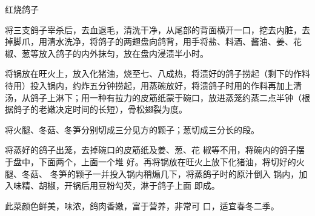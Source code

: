 \begin{recipe}{红烧鸽子}

\ingredients



\cooking

\step 将三支鸽子宰杀后，去血退毛，清洗干净，从尾部的背面横开一口，挖去内脏，去掉脚爪，用清水洗净，将鸽子的两翅盘向鸽背，用手将盐、料酒、酱油、姜、花椒、葱等放入鸽子的内外抹匀，放在盘内浸渍半小时。

\step 将锅放在旺火上，放入化猪油，烧至七、八成热，将渍好的鸽子捞起（剩下的作料待用）投入锅内，约炸五分钟捞起，用蒸碗放好，将溃鸽子时用的作料再加上清汤，从鸽子上淋下；用一种有拉力的皮筋纸蒙于碗口，放进蒸笼约蒸二点半钟（根据鸽子的老嫩决定时间的长短），骨松翅裂为度。

\step 将火腿、冬菇、冬笋分别切成三分见方的颗子；葱切成三分长的段。

将蒸好的鸽子出笼，去掉碗口的皮筋纸及姜、葱、花 椒等不用，将碗内的鸽子摆于盘中，下面两个，上面一个堆 好。再将锅放在旺火上放下化猪油，将切好的火腿、冬菇、 冬笋的颗子一并投入锅内稍煽几下，将蒸鸽子时的原汁倒入 锅内，加入味精、胡椒，开锅后用豆粉勾芡，淋于鸽子上面 即成。

\notes

此菜颜色鲜美，味浓，鸽肉香嫩，富于营养，非常可 口，适宜春冬二季。

\end{recipe}

